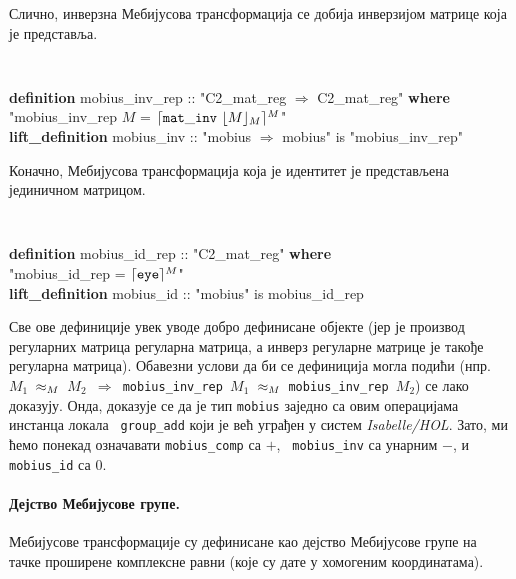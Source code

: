 \noindent Слично, инверзна Мебијусова трансформација се добија
инверзијом матрице која је представља.

{\tt
\begin{tabbing}
\textbf{def}\=\textbf{inition} mobius\_inv\_rep :: "C2\_mat\_reg $\Rightarrow$ C2\_mat\_reg" \textbf{where} \\
         \>"mobius\_inv\_rep $M$ = $\Absrm{\mathtt{mat\_inv}\ \Reprm{M}}$"\\
\textbf{lift\_definition} mobius\_inv :: "mobius $\Rightarrow$ mobius" is "mobius\_inv\_rep"
\end{tabbing}
}
\noindent Коначно, Мебијусова трансформација која је идентитет је
представљена јединичном матрицом.  
{\tt
\begin{tabbing}
\textbf{def}\=\textbf{inition} mobius\_id\_rep :: "C2\_mat\_reg" \textbf{where} \\
\> "mobius\_id\_rep = $\lceil\mathtt{eye}\rceil^{M}$"\\
\textbf{lift\_definition} mobius\_id :: "mobius" is mobius\_id\_rep
\end{tabbing}
}

Све ове дефиниције увек уводе добро дефинисане објекте (јер је
производ регуларних матрица регуларна матрица, а инверз регуларне
матрице је такође регуларна матрица). Обавезни услови да би се
дефиниција могла подићи (нпр. {\tt $M_1$ $\approx_{M}$ $M_2$
  $\Longrightarrow$ mobius\_inv\_rep $M_1$ $\approx_{M}$
  mobius\_inv\_rep $M_2$}) се лако доказују. Онда, доказује се да је
тип {\tt mobius} заједно са овим операцијама инстанца локала {\tt
  group\_add} који је већ уграђен у систем \emph{Isabelle/HOL}. Зато,
ми ћемо понекад означавати {\tt mobius\_comp} са $+$, {\tt
  mobius\_inv} са унарним $-$, и {\tt mobius\_id} са $0$.

\paragraph{Дејство Мебијусове групе.}

Мебијусове трансформације су дефинисане као дејство Мебијусове групе
на тачке проширене комплексне равни (које су дате у хомогеним
координатама).

